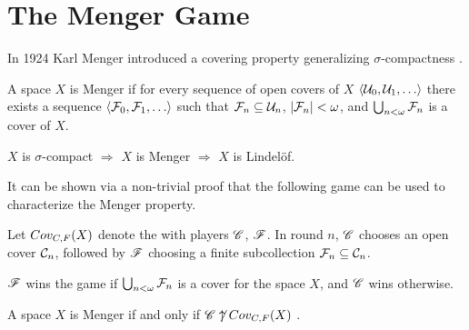 
\chapter{The Menger Game}

In 1924 Karl Menger introduced a covering property generalizing
$\sigma$-compactness \cite{custom31879423}.

\begin{defn}
  A space $X$ is Menger if for every sequence of open covers of $X$
  $\<\mc U_0,\mc U_1,\dots\>$ there exists a sequence
  $\<\mc F_0,\mc F_1,\dots\>$ such that $\mathcal{F}_n\subseteq \mathcal{U}_n$,
  $|\mathcal{F}_n|<\omega$, and $\bigcup_{n<\omega}\mathcal{F}_n$ is a cover of $X$.
\end{defn}

\begin{prop}
  $X$ is $\sigma$-compact
    $\Rightarrow$
  $X$ is Menger
    $\Rightarrow$
  $X$ is Lindel\"of.
\end{prop}

It can be shown via a non-trivial proof that the following game can be
used to characterize the Menger property.

\begin{game}
  Let $Cov_{C,F}(X)$ denote the  with players $\mathscr{C}$, $\mathscr{F}$.
  In round $n$, $\mathscr{C}$ chooses an open cover $\mathcal{C}_n$, followed by $\mathscr{F}$
  choosing a finite subcollection $\mathcal{F}_n\subseteq \mathcal{C}_n$.

  $\mathscr{F}$ wins the game if $\bigcup_{n<\omega}\mathcal{F}_n$ is a cover for the space
  $X$, and $\mathscr{C}$ wins otherwise.
\end{game}

\begin{thm}
  A space $X$ is Menger if and only if $\mathscr{C}\not\uparrow Cov_{C,F}(X)$
  \cite{MR1544773}.
\end{thm}





